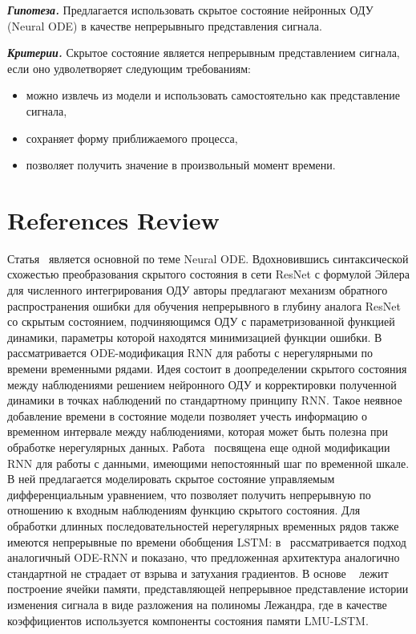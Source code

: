 \textit{\textbf{Гипотеза.}}
Предлагается использовать скрытое состояние нейронных ОДУ (Neural ODE) в качестве непрерывныго представления сигнала.

\textit{\textbf{Критерии.}}
Скрытое состояние является непрерывным представлением сигнала, если оно удволетворяет следующим требованиям:
\begin{itemize}
    \item можно извлечь из модели и использовать самостоятельно как представление сигнала,
    \item сохраняет форму приближаемого процесса,
    \item позволяет получить значение в произвольный момент времени.
\end{itemize}
\section{References Review}
Статья~\cite{NEURIPS2018_69386f6b} является основной по теме Neural ODE. Вдохновившись синтаксической схожестью преобразования скрытого состояния в сети ResNet с формулой Эйлера для численного интегрирования ОДУ авторы предлагают механизм обратного распространения ошибки для обучения непрерывного в глубину аналога ResNet со скрытым состоянием, подчиняющимся ОДУ с параметризованной функцией динамики, параметры которой находятся минимизацией функции ошибки. В~\cite{NEURIPS2019_42a6845a} рассматривается ODE-модификация RNN для работы с нерегулярными по времени временными рядами. Идея состоит в доопределении скрытого состояния между наблюдениями решением нейронного ОДУ и корректировки полученной динамики в точках наблюдений по стандартному принципу RNN. Такое неявное добавление времени в состояние модели позволяет учесть информацию о временном интервале между наблюдениями, которая может быть полезна при обработке нерегулярных данных. Работа~\cite{DBLP:journals/corr/abs-2005-08926} посвящена еще одной модификации RNN для работы с данными, имеющими непостоянный шаг по временной шкале. В ней предлагается моделировать скрытое состояние управляемым дифференциальным уравнением, что позволяет получить непрерывную по отношению к входным наблюдениям функцию скрытого состояния. Для обработки длинных последовательностей нерегулярных временных рядов также имеются непрерывные по времени обобщения LSTM: в~\cite{DBLP:journals/corr/abs-2006-04418} рассматривается подход аналогичный ODE-RNN и показано, что предложенная архитектура аналогично стандартной не страдает от взрыва и затухания градиентов. В основе ~\cite{NEURIPS2019_952285b9} лежит построение ячейки памяти, представляющей непрерывное представление истории изменения сигнала в виде разложения на полиномы Лежандра, где в качестве коэффициентов используется компоненты состояния памяти LMU-LSTM.
